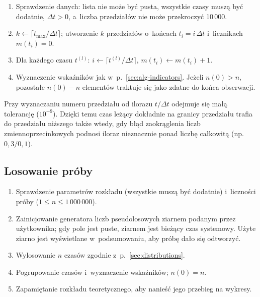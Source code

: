 \begin{enumerate}
  \item Sprawdzenie danych: lista nie może być pusta, wszystkie czasy muszą być
    dodatnie, $\Delta t > 0$, a~liczba przedziałów nie może przekroczyć 10\,000.
  \item $k \leftarrow \lceil t_{\max} / \Delta t \rceil$; utworzenie $k$ przedziałów
    o~końcach $t_i = i\,\Delta t$ i~licznikach $m(t_i) = 0$.
  \item Dla każdego czasu $t^{(l)}$: $i \leftarrow \lceil t^{(l)} / \Delta t \rceil$,
    $m(t_i) \leftarrow m(t_i) + 1$.
  \item Wyznaczenie wskaźników jak w~p.~\ref{sec:alg-indicators}. Jeżeli $n(0) > n$,
    pozostałe $n(0) - n$ elementów traktuje się jako zdatne do końca obserwacji.
\end{enumerate}

Przy wyznaczaniu numeru przedziału od ilorazu $t / \Delta t$ odejmuje się małą
tolerancję ($10^{-9}$). Dzięki temu czas leżący dokładnie na granicy przedziału
trafia do przedziału niższego także wtedy, gdy błąd zaokrąglenia liczb
zmiennoprzecinkowych podnosi iloraz nieznacznie ponad liczbę całkowitą
(np. $0{,}3 / 0{,}1$).

\subsection{Losowanie próby}

\begin{enumerate}
  \item Sprawdzenie parametrów rozkładu (wszystkie muszą być dodatnie) i~liczności
    próby ($1 \leq n \leq 1\,000\,000$).
  \item Zainicjowanie generatora liczb pseudolosowych ziarnem podanym przez
    użytkownika; gdy pole jest puste, ziarnem jest bieżący czas systemowy. Użyte
    ziarno jest wyświetlane w~podsumowaniu, aby próbę dało się odtworzyć.
  \item Wylosowanie $n$ czasów zgodnie z~p.~\ref{sec:distributions}.
  \item Pogrupowanie czasów i~wyznaczenie wskaźników; $n(0) = n$.
  \item Zapamiętanie rozkładu teoretycznego, aby nanieść jego przebieg na wykresy.
\end{enumerate}
